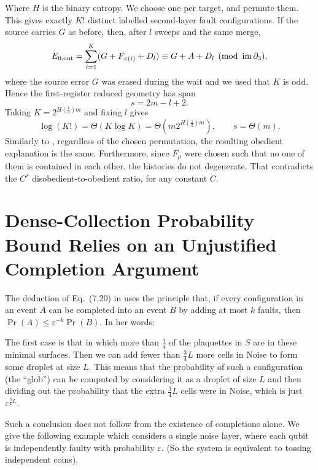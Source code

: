 \documentclass[manuscript,screen,review]{acmart}
\begin{document}
Where $H$ is the binary entropy. We choose one per target, and permute them. This gives exactly $K!$ distinct labelled second-layer fault configurations. If the source carries $G$ as before, then, after $l$ sweeps and the same merge,
\[
 E_{0,\mathrm{out}}
 =\sum_{i=1}^K(G+F_{\pi(i)}+D_l)
 \equiv G+A+D_l\pmod{\operatorname{im}\partial_3},
\]
where the source error $G$ was erased during the wait and we used that $K$ is odd. Hence the first-register reduced geometry has span
\[
 s=2m-l+2.
\]
Taking $K=2^{H(\frac{1}{3})m}$ and fixing $l$ gives
\begin{equation}\label{eq:factorial}
  \log(K!)=\Theta(K\log K)=\Theta(m2^{H(\frac{1}{3})m}),\qquad s=\Theta(m).
\end{equation}
Similarly to , regardless of the chosen permutation, the resulting obedient explanation is the same. Furthermore, since $F_{\mu}$ were chosen such that no one of them is contained in each other, the histories do not degenerate. That contradicts the $C^{s}$ disobedient-to-obedient ratio, for any constant $C$.


\section{Dense-Collection Probability Bound Relies on an Unjustified Completion Argument}

The deduction of Eq.~(7.20) in \cite[pp.~109--110]{Ahn2004} uses the principle that, if every configuration in an event $A$ can be completed into an event $B$ by adding at most $k$ faults, then $\Pr(A)\le\varepsilon^{-k}\Pr(B)$. In her words:



\begin{framed}
  The first case is that in which more than $\frac{1}{4}$ of the plaquettes in $S$ are in these minimal surfaces. Then we can add fewer than $\frac{3}{4} L$ more cells in Noise to form some droplet at size $L$. This means that the probability of such a configuration (the ``glob'') can be computed by considering it as a droplet of size $L$ and then dividing out the probability that the extra $\frac{3}{4}L$ cells were in Noise, which is just $\varepsilon^{\frac{3}{4}L}$.
\end{framed}


Such a conclusion does not follow from the existence of completions alone. We give the following example which considers a single noise layer, where each qubit is independently faulty with probability $\varepsilon$. (So the system is equivalent to tossing independent coins).
\end{document}

